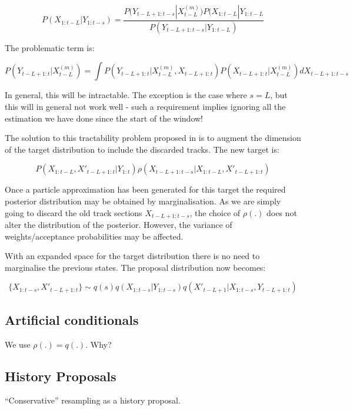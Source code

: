 \begin{equation}
P(X_{1:t-L}|Y_{1:t-s}) = \frac{P(Y_{t-L+1:t-s}|X_{t-L}^{(m)}) P(X_{1:t-L}|Y_{1:t-L} }{P(Y_{t-L+1:t-s}|Y_{1:t-L})}
\label{eq:}
\end{equation}

The problematic term is:

\begin{equation}
P(Y_{t-L+1:t}|X^{(m)}_{t-L}) = \int P(Y_{t-L+1:t}|X^{(m)}_{t-L}, X_{t-L+1:t}) P(X_{t-L+1:t}|X^{(m)}_{t-L}) dX_{t-L+1:t-s}
\label{eq:}
\end{equation}

In general, this will be intractable. The exception is the case where $s=L$, but this will in general not work well - such a requirement implies ignoring all the estimation we have done since the start of the window!

The solution to this tractability problem proposed in \cite{Doucet2006} is to augment the dimension of the target distribution to include the discarded tracks. The new target is:

\begin{equation}
P(X_{1:t-L}, X'_{t-L+1:t}|Y_{1:t}) \rho(X_{t-L+1:t-s}|X_{1:t-L}, X'_{t-L+1:t})
\label{eq:}
\end{equation}

Once a particle approximation has been generated for this target the required posterior distribution may be obtained by marginalisation. As we are simply going to discard the old track sections $X_{t-L+1:t-s}$, the choice of $\rho(.)$ does not alter the distribution of the posterior. However, the variance of weights/acceptance probabilities may be affected.

With an expanded space for the target distribution there is no need to marginalise the previous states. The proposal distribution now becomes:

\begin{equation}
\{X_{1:t-s}, X'_{t-L+1:t}\} \sim q(s) q(X_{1:t-s}|Y_{1:t-s}) q(X'_{t-L+1}|X_{1:t-s}, Y_{t-L+1:t})
\label{eq:ExtendedFLProposal}
\end{equation}

\subsection{Artificial conditionals}

We use $\rho(.)=q(.)$. Why?

\subsection{History Proposals}

``Conservative'' resampling as a history proposal.